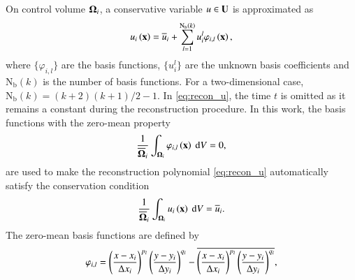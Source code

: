 
 On control volume $\mathbf{\Omega}_i$, a conservative variable $u \in \mathbf{U}$ is approximated as
\begin{equation}
    \label{eq:recon_u}
    u_i \left(\mathbf{x}\right)= \overline{u}_i + \sum^{\mathrm{N_b}\left(k\right)}_{l=1} u_i^l \varphi_{i,l} \left(\mathbf{x}\right),
\end{equation}
where $\{\varphi_{i,l}\}$ are the basis functions, $\{u^l_i\}$ are the unknown basis coefficients and $\mathrm{N_b}(k)$ is the number of basis functions. For a two-dimensional case, $\mathrm{N_b}(k)=  (k+2)(k+1)/2 -1$. In \eqref{eq:recon_u}, the time $t$ is omitted as it remains a constant during the reconstruction procedure.
In this work, the basis functions with the zero-mean property
\begin{equation}
    \frac{1}{\overline{\mathbf{\Omega}}_i} \int_{\mathbf{\Omega}_i} \varphi_{i,l} \left(\mathbf{x}\right) \ \dd V=0,
\end{equation}
are used to make the reconstruction polynomial \eqref{eq:recon_u} automatically satisfy the conservation condition
\begin{equation}
    \label{eq:zero-mean}
    \frac{1}{\overline{\mathbf{\Omega}}_i}\int_{\mathbf{\Omega}_i}u_i \left(\mathbf{x}\right)\ \dd V= \overline{u}_i.
\end{equation}
The zero-mean basis functions are defined by
\begin{equation}
    \varphi_{i,l} =
    \left(\frac{x - x_{i}}{\mathrm\Delta x_i}\right)^{p_l}
    \left(\frac{y - y_{i}}{\mathrm\Delta y_i}\right)^{q_l}
    -
    \overline{
        \left(\frac{x - x_{i}}{\mathrm\Delta x_i}\right)^{p_l}
        \left(\frac{y - y_{i}}{\mathrm\Delta y_i}\right)^{q_l}
    },
\end{equation}
